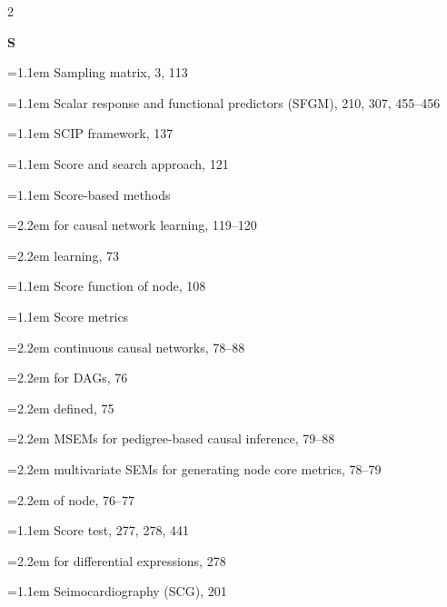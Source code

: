 \begin{multicols}{2}
\par{}\medskip\noindent\textbf{S}\par\nobreak\smallskip\nobreak
\noindent\hangindent=1.1em Sampling matrix, 3, 113\par
\noindent\hangindent=1.1em Scalar response and functional predictors (SFGM), 210, 307, 455--456\par
\noindent\hangindent=1.1em SCIP framework, 137\par
\noindent\hangindent=1.1em Score and search approach, 121\par
\noindent\hangindent=1.1em Score-based methods\par
\noindent\hangindent=2.2em \hspace*{1.1em}for causal network learning, 119--120\par
\noindent\hangindent=2.2em \hspace*{1.1em}learning, 73\par
\noindent\hangindent=1.1em Score function of node, 108\par
\noindent\hangindent=1.1em Score metrics\par
\noindent\hangindent=2.2em \hspace*{1.1em}continuous causal networks, 78--88\par
\noindent\hangindent=2.2em \hspace*{1.1em}for DAGs, 76\par
\noindent\hangindent=2.2em \hspace*{1.1em}defined, 75\par
\noindent\hangindent=2.2em \hspace*{1.1em}MSEMs for pedigree-based causal inference, 79--88\par
\noindent\hangindent=2.2em \hspace*{1.1em}multivariate SEMs for generating node core metrics, 78--79\par
\noindent\hangindent=2.2em \hspace*{1.1em}of node, 76--77\par
\noindent\hangindent=1.1em Score test, 277, 278, 441\par
\noindent\hangindent=2.2em \hspace*{1.1em}for differential expressions, 278\par
\noindent\hangindent=1.1em Seimocardiography (SCG), 201\par

\end{multicols}
